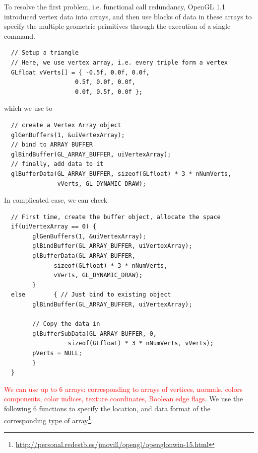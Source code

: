 To resolve the first problem, i.e. functional call redundancy, OpenGL
1.1 introduced vertex data into arrays, and then use blocks of data in
these arrays to specify the multiple geometric primitives through the
execution of a single command.
\begin{verbatim}
  // Setup a triangle
  // Here, we use vertex array, i.e. every triple form a vertex
  GLfloat vVerts[] = { -0.5f, 0.0f, 0.0f,
                    0.5f, 0.0f, 0.0f,
                    0.0f, 0.5f, 0.0f };
\end{verbatim}
which we use to 
\begin{verbatim}
  // create a Vertex Array object
  glGenBuffers(1, &uiVertexArray);
  // bind to ARRAY BUFFER
  glBindBuffer(GL_ARRAY_BUFFER, uiVertexArray);
  // finally, add data to it
  glBufferData(GL_ARRAY_BUFFER, sizeof(GLfloat) * 3 * nNumVerts, 
               vVerts, GL_DYNAMIC_DRAW);
\end{verbatim}
In complicated case, we can check
\begin{verbatim}
  // First time, create the buffer object, allocate the space
  if(uiVertexArray == 0) {
        glGenBuffers(1, &uiVertexArray);
        glBindBuffer(GL_ARRAY_BUFFER, uiVertexArray);
        glBufferData(GL_ARRAY_BUFFER, 
              sizeof(GLfloat) * 3 * nNumVerts, 
              vVerts, GL_DYNAMIC_DRAW);
        }
  else        { // Just bind to existing object
        glBindBuffer(GL_ARRAY_BUFFER, uiVertexArray);

        // Copy the data in
        glBufferSubData(GL_ARRAY_BUFFER, 0, 
                  sizeof(GLfloat) * 3 * nNumVerts, vVerts);
        pVerts = NULL;
        }
  }
\end{verbatim}

\textcolor{red}{We can use up to 6 arrays: corresponding to arrays of
  vertices, normals, colors components, color indices, texture
  coordinates, Boolean edge flags}.
We use the following 6 functions to specify the location, and data
format of the corresponding type of
array\footnote{\url{http://personal.redestb.es/jmovill/opengl/openglonwin-15.html}}.

